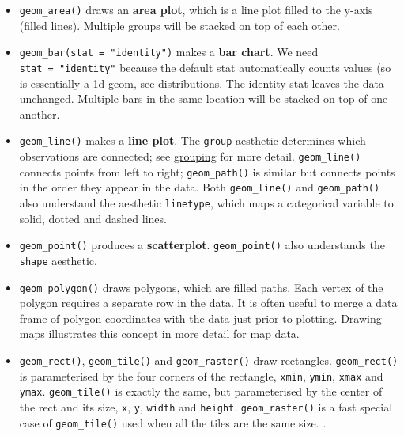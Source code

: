 \begin{itemize}
\item
  \texttt{geom\_area()} draws an \textbf{area plot}, which is a line
  plot filled to the y-axis (filled lines). Multiple groups will be
  stacked on top of each other.  
\item
  \texttt{geom\_bar(stat\ =\ "identity")} makes a \textbf{bar chart}. We
  need \texttt{stat\ =\ "identity"} because the default stat
  automatically counts values (so is essentially a 1d geom, see
  \hyperref[sec:distributions]{distributions}. The identity stat leaves
  the data unchanged. Multiple bars in the same location will be stacked
  on top of one another. 
\item
  \texttt{geom\_line()} makes a \textbf{line plot}. The \texttt{group}
  aesthetic determines which observations are connected; see
  \hyperref[sec:grouping]{grouping} for more detail.
  \texttt{geom\_line()} connects points from left to right;
  \texttt{geom\_path()} is similar but connects points in the order they
  appear in the data. Both \texttt{geom\_line()} and
  \texttt{geom\_path()} also understand the aesthetic \texttt{linetype},
  which maps a categorical variable to solid, dotted and dashed lines.
    
\item
  \texttt{geom\_point()} produces a \textbf{scatterplot}.
  \texttt{geom\_point()} also understands the \texttt{shape} aesthetic.
\item
  \texttt{geom\_polygon()} draws polygons, which are filled paths. Each
  vertex of the polygon requires a separate row in the data. It is often
  useful to merge a data frame of polygon coordinates with the data just
  prior to plotting. \hyperref[sec:maps]{Drawing maps} illustrates this
  concept in more detail for map data. 
\item
  \texttt{geom\_rect()}, \texttt{geom\_tile()} and
  \texttt{geom\_raster()} draw rectangles. \texttt{geom\_rect()} is
  parameterised by the four corners of the rectangle, \texttt{xmin},
  \texttt{ymin}, \texttt{xmax} and \texttt{ymax}. \texttt{geom\_tile()}
  is exactly the same, but parameterised by the center of the rect and
  its size, \texttt{x}, \texttt{y}, \texttt{width} and \texttt{height}.
  \texttt{geom\_raster()} is a fast special case of
  \texttt{geom\_tile()} used when all the tiles are the same size.
    .
   
\end{itemize}

